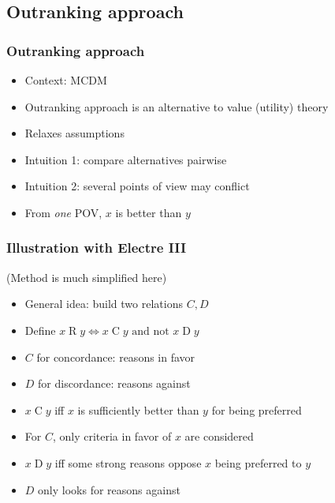 \documentclass[french,english]{beamer}
\begin{document}
\subsection{Outranking approach}
\begin{frame}
	\frametitle{Outranking approach}
	\begin{itemize}
		\item Context: MCDM
		\item Outranking approach is an alternative to value (utility) theory
		\item Relaxes assumptions
		\item Intuition 1: compare alternatives pairwise
		\item Intuition 2: several points of view may conflict
		\item From \emph{one} POV, $x$ is better than $y$
	\end{itemize}
\end{frame}

\begin{frame}
	\frametitle{Illustration with Electre III}
	(Method is much simplified here)
	\begin{itemize}
		\item General idea: build two relations $C, D$
		\item Define $x {\mathrel{R}} y ⇔ x {\mathrel{C}} y \text{ and not } x {\mathrel{D}} y$
		\item $C$ for concordance: reasons in favor
		\item $D$ for discordance: reasons against
		\item $x \mathrel{C} y$ iff $x$ is sufficiently better than $y$ for being preferred
		\item For $C$, only criteria in favor of $x$ are considered
		\item $x \mathrel{D} y$ iff some strong reasons oppose $x$ being preferred to $y$
		\item $D$ only looks for reasons against
	\end{itemize}
\end{frame}
\end{document}
